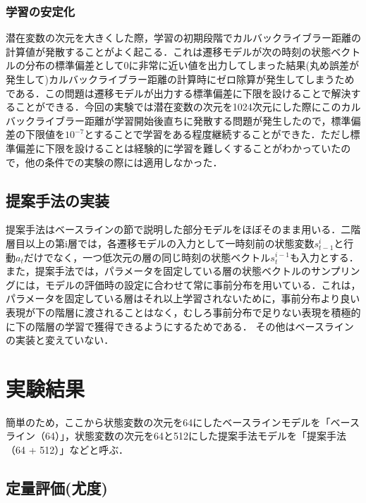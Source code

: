 \documentclass[10pt, twocolumn]{jarticle}
\begin{document}
\subsubsection{学習の安定化}
潜在変数の次元を大きくした際，学習の初期段階でカルバックライブラー距離の計算値が発散することがよく起こる．これは遷移モデルが次の時刻の状態ベクトルの分布の標準偏差として0に非常に近い値を出力してしまった結果(丸め誤差が発生して)カルバックライブラー距離の計算時にゼロ除算が発生してしまうためである．この問題は遷移モデルが出力する標準偏差に下限を設けることで解決することができる．今回の実験では潜在変数の次元を1024次元にした際にこのカルバックライブラー距離が学習開始後直ちに発散する問題が発生したので，標準偏差の下限値を$10^{-7}$とすることで学習をある程度継続することができた．ただし標準偏差に下限を設けることは経験的に学習を難しくすることがわかっていたので，他の条件での実験の際には適用しなかった．

\subsection{提案手法の実装}
提案手法はベースラインの節で説明した部分モデルをほぼそのまま用いる．二階層目以上の第i層では，各遷移モデルの入力として一時刻前の状態変数$s^i_{t-1}$と行動$a_t$だけでなく，一つ低次元の層の同じ時刻の状態ベクトル$s^{i-1}_t$も入力とする．また，提案手法では，パラメータを固定している層の状態ベクトルのサンプリングには，モデルの評価時の設定に合わせて常に事前分布を用いている．これは，パラメータを固定している層はそれ以上学習されないために，事前分布より良い表現が下の階層に渡されることはなく，むしろ事前分布で足りない表現を積極的に下の階層の学習で獲得できるようにするためである．
その他はベースラインの実装と変えていない．


\section{実験結果}

簡単のため，ここから状態変数の次元を64にしたベースラインモデルを「ベースライン（64）」，状態変数の次元を64と512にした提案手法モデルを「提案手法（64 + 512）」などと呼ぶ．

\subsection{定量評価(尤度)}
\end{document}

